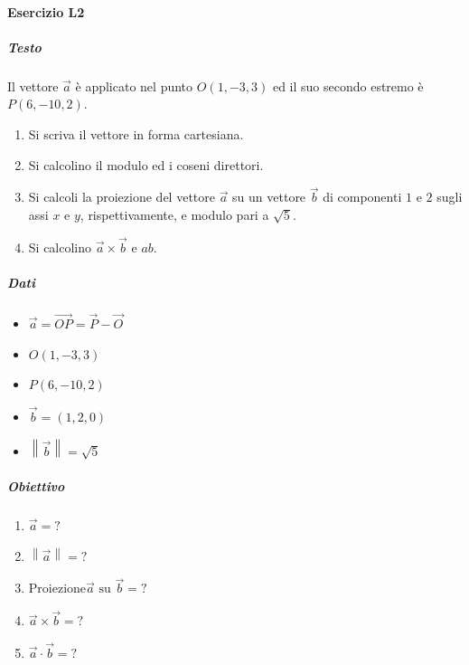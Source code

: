 \documentclass{article}
\newcommand{\norm}[1]{\left\lVert#1\right\rVert}
\begin{document}
\paragraph*{Esercizio L2}
\subparagraph*{Testo}
Il vettore $\vec{a}$ è applicato nel punto \( O(1, -3, 3) \) ed il suo secondo estremo è \( P(6, -10, 2) \).
\begin{enumerate}
    \item[(a)] Si scriva il vettore in forma cartesiana.
    \item[(b)] Si calcolino il modulo ed i coseni direttori.
    \item[(c)] Si calcoli la proiezione del vettore \( \vec{a} \) su un vettore \( \vec{b} \) di componenti \( 1 \) e \( 2 \) sugli assi \( x \) e \( y \), rispettivamente, e modulo pari a \( \sqrt{5} \).
    \item[(d)] Si calcolino \( \vec{a} \times \vec{b} \) e \( ab \).
\end{enumerate}
\subparagraph*{Dati}
\begin{itemize}
    \item $\vec{a} = \vec{OP} = \vec{P} - \vec{O}$
    \item $O(1, -3, 3)$
    \item $P(6, -10, 2)$
    \item $\vec{b} = (1, 2, 0)$
    \item $\norm{\vec{b}} = \sqrt{5}$
\end{itemize}
\subparagraph*{Obiettivo}
\begin{enumerate}
    \item[(a)] $\vec{a} = ?$
    \item[(b)] $\norm{\vec{a}} = ?$
    \item[(c)] $\text{Proiezione} \vec{a} \text{ su } \vec{b} = ?$
    \item[(d)] $\vec{a} \times \vec{b} = ?$
    \item[(e)] $\vec{a} \cdot \vec{b} = ?$
\end{enumerate}
\end{document}
